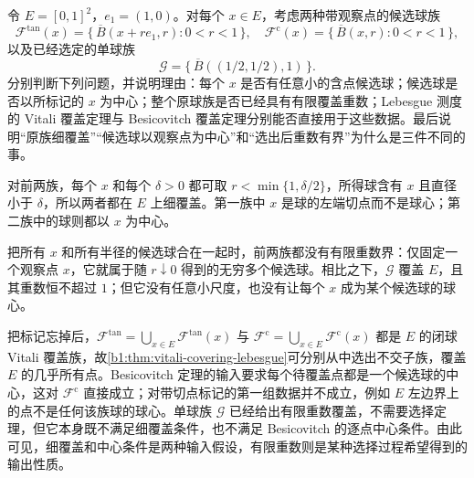 \begin{exercise}\label{b1:ex:13-covering-hypotheses}
令 \(E=[0,1]^2\)，\(e_1=(1,0)\)。对每个 \(x\in E\)，考虑两种带观察点的候选球族
\[
 \mathcal F^{\mathrm{tan}}(x)
 =\{\,\overline B(x+re_1,r):0<r<1\,\},
 \quad
 \mathcal F^{\mathrm c}(x)
 =\{\,\overline B(x,r):0<r<1\,\},
\]
以及已经选定的单球族
\[
 \mathcal G=\{\,\overline B((1/2,1/2),1)\,\}.
\]
分别判断下列问题，并说明理由：每个 \(x\) 是否有任意小的含点候选球；候选球是否以所标记的 \(x\) 为中心；整个原球族是否已经具有有限覆盖重数；Lebesgue 测度的 Vitali 覆盖定理与 Besicovitch 覆盖定理分别能否直接用于这些数据。最后说明“原族细覆盖”“候选球以观察点为中心”和“选出后重数有界”为什么是三件不同的事。
\end{exercise}
\begin{solution}
对前两族，每个 \(x\) 和每个 \(\delta>0\) 都可取 \(r<\min\{1,\delta/2\}\)，所得球含有 \(x\) 且直径小于 \(\delta\)，所以两者都在 \(E\) 上细覆盖。第一族中 \(x\) 是球的左端切点而不是球心；第二族中的球则都以 \(x\) 为中心。

把所有 \(x\) 和所有半径的候选球合在一起时，前两族都没有有限重数界：仅固定一个观察点 \(x\)，它就属于随 \(r\downarrow0\) 得到的无穷多个候选球。相比之下，\(\mathcal G\) 覆盖 \(E\)，且其重数恒不超过 \(1\)；但它没有任意小尺度，也没有让每个 \(x\) 成为某个候选球的球心。

把标记忘掉后，\(\mathcal F^{\mathrm{tan}}=\bigcup_{x\in E}\mathcal F^{\mathrm{tan}}(x)\) 与
\(\mathcal F^{\mathrm c}=\bigcup_{x\in E}\mathcal F^{\mathrm c}(x)\) 都是 \(E\) 的闭球 Vitali 覆盖族，故\cref{b1:thm:vitali-covering-lebesgue}可分别从中选出不交子族，覆盖 \(E\) 的几乎所有点。Besicovitch 定理的输入要求每个待覆盖点都是一个候选球的中心，这对 \(\mathcal F^{\mathrm c}\) 直接成立；对带切点标记的第一组数据并不成立，例如 \(E\) 左边界上的点不是任何该族球的球心。单球族 \(\mathcal G\) 已经给出有限重数覆盖，不需要选择定理，但它本身既不满足细覆盖条件，也不满足 Besicovitch 的逐点中心条件。由此可见，细覆盖和中心条件是两种输入假设，有限重数则是某种选择过程希望得到的输出性质。
\end{solution}

